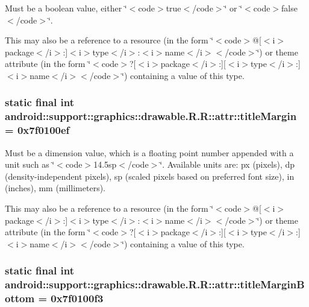 Must be a boolean value, either \char`\"{}$<$code$>$true$<$/code$>$\char`\"{} or \char`\"{}$<$code$>$false$<$/code$>$\char`\"{}. 

This may also be a reference to a resource (in the form \char`\"{}$<$code$>$@\mbox{[}$<$i$>$package$<$/i$>$:\mbox{]}$<$i$>$type$<$/i$>$:$<$i$>$name$<$/i$>$$<$/code$>$\char`\"{}) or theme attribute (in the form \char`\"{}$<$code$>$?\mbox{[}$<$i$>$package$<$/i$>$:\mbox{]}\mbox{[}$<$i$>$type$<$/i$>$:\mbox{]}$<$i$>$name$<$/i$>$$<$/code$>$\char`\"{}) containing a value of this type. \hypertarget{classandroid_1_1support_1_1graphics_1_1drawable_1_1_r_1_1attr_3d95b77c3f7bd99531127582198e5d8f}{
\subsubsection[{titleMargin}]{\setlength{\rightskip}{0pt plus 5cm}static final int android::support::graphics::drawable.R.R::attr::titleMargin = 0x7f0100ef}}
\label{classandroid_1_1support_1_1graphics_1_1drawable_1_1_r_1_1attr_3d95b77c3f7bd99531127582198e5d8f}


Must be a dimension value, which is a floating point number appended with a unit such as \char`\"{}$<$code$>$14.5sp$<$/code$>$\char`\"{}. Available units are: px (pixels), dp (density-independent pixels), sp (scaled pixels based on preferred font size), in (inches), mm (millimeters). 

This may also be a reference to a resource (in the form \char`\"{}$<$code$>$@\mbox{[}$<$i$>$package$<$/i$>$:\mbox{]}$<$i$>$type$<$/i$>$:$<$i$>$name$<$/i$>$$<$/code$>$\char`\"{}) or theme attribute (in the form \char`\"{}$<$code$>$?\mbox{[}$<$i$>$package$<$/i$>$:\mbox{]}\mbox{[}$<$i$>$type$<$/i$>$:\mbox{]}$<$i$>$name$<$/i$>$$<$/code$>$\char`\"{}) containing a value of this type. \hypertarget{classandroid_1_1support_1_1graphics_1_1drawable_1_1_r_1_1attr_5d0d0ea3393b2ccb4a0d9155bced8e76}{
\subsubsection[{titleMarginBottom}]{\setlength{\rightskip}{0pt plus 5cm}static final int android::support::graphics::drawable.R.R::attr::titleMarginBottom = 0x7f0100f3}}
\label{classandroid_1_1support_1_1graphics_1_1drawable_1_1_r_1_1attr_5d0d0ea3393b2ccb4a0d9155bced8e76}


